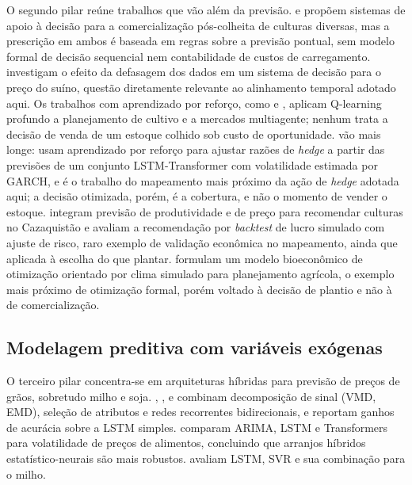 O segundo pilar reúne trabalhos que vão além da previsão.  e  propõem sistemas de apoio à decisão para a comercialização pós-colheita de culturas diversas, mas a prescrição em ambos é baseada em regras sobre a previsão pontual, sem modelo formal de decisão sequencial nem contabilidade de custos de carregamento.  investigam o efeito da defasagem dos dados em um sistema de decisão para o preço do suíno, questão diretamente relevante ao alinhamento temporal adotado aqui. Os trabalhos com aprendizado por reforço, como  e , aplicam Q-learning profundo a planejamento de cultivo e a mercados multiagente; nenhum trata a decisão de venda de um estoque colhido sob custo de oportunidade.  vão mais longe: usam aprendizado por reforço para ajustar razões de \textit{hedge} a partir das previsões de um conjunto LSTM-Transformer com volatilidade estimada por GARCH, e é o trabalho do mapeamento mais próximo da ação de \textit{hedge} adotada aqui; a decisão otimizada, porém, é a cobertura, e não o momento de vender o estoque.  integram previsão de produtividade e de preço para recomendar culturas no Cazaquistão e avaliam a recomendação por \textit{backtest} de lucro simulado com ajuste de risco, raro exemplo de validação econômica no mapeamento, ainda que aplicada à escolha do que plantar.  formulam um modelo bioeconômico de otimização orientado por clima simulado para planejamento agrícola, o exemplo mais próximo de otimização formal, porém voltado à decisão de plantio e não à de comercialização.

\subsection{Modelagem preditiva com variáveis exógenas}

O terceiro pilar concentra-se em arquiteturas híbridas para previsão de preços de grãos, sobretudo milho e soja. , ,  e  combinam decomposição de sinal (VMD, EMD), seleção de atributos e redes recorrentes bidirecionais, e reportam ganhos de acurácia sobre a LSTM simples.  comparam ARIMA, LSTM e Transformers para volatilidade de preços de alimentos, concluindo que arranjos híbridos estatístico-neurais são mais robustos.  avaliam LSTM, SVR e sua combinação para o milho.

